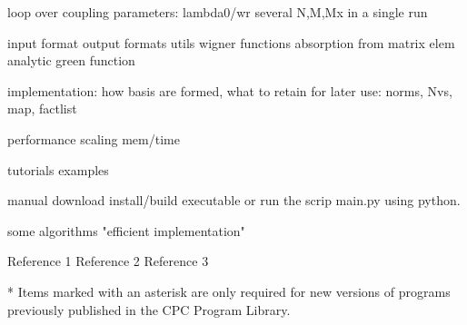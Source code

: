\documentclass[final,twocolumn]{elsarticle}
\begin{document}
\begin{small}
{loop over coupling parameters: lambda0/wr
several N,M,Mx in a single run

input format
output formats
utils
wigner functions
absorption from matrix elem
analytic green function

implementation:
how basis are formed, what to retain for later use: norms, Nvs, map, factlist

performance
scaling
mem/time

tutorials
examples

manual
download
install/build executable or run the scrip main.py using python.


some algorithms
"efficient implementation"

}




































\begin{thebibliography}{0}
Reference 1         %
Reference 2         %
Reference 3         %
\end{thebibliography}
* Items marked with an asterisk are only required for new versions
of programs previously published in the CPC Program Library.\\
\end{small}


\section{}
\label{}

\end{document}
